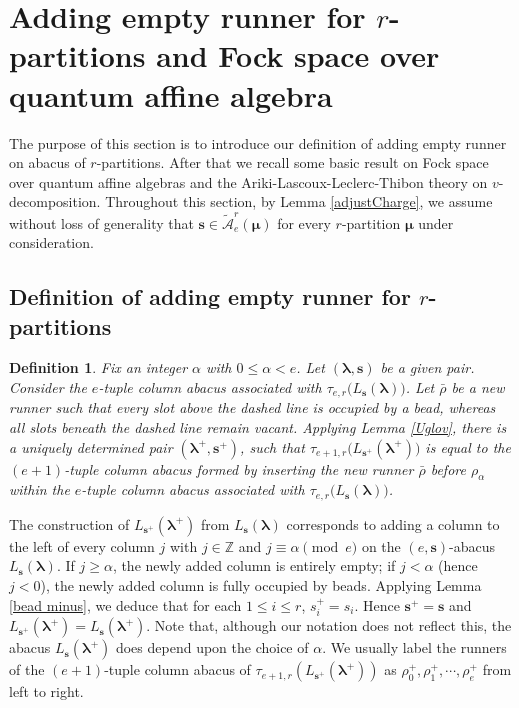 \documentclass[a4paper,10pt]{amsart}
\theoremstyle{plain}
\def\bs{{\boldsymbol{s}}}
\def\blam{{\boldsymbol \lambda}}
\theoremstyle{plain}
\newtheorem{dfn}[theorem]{Definition}
\numberwithin{equation}{section}
\begin{document}
\bigskip
\section{Adding empty runner for $r$-partitions and Fock space over quantum affine algebra}

The purpose of this section is to introduce our definition of adding empty runner on abacus of $r$-partitions. After that we recall some basic result on Fock space over quantum affine algebras and the Ariki-Lascoux-Leclerc-Thibon theory on $v$-decomposition. Throughout this section, by Lemma \ref{adjustCharge}, we assume without loss of generality that \(\boldsymbol{s} \in \widetilde{\mathcal A}^r_e(\boldsymbol{\mu})\) for every $r$-partition \(\boldsymbol{\mu}\) under consideration.

\smallskip
\subsection{Definition of adding empty runner for $r$-partitions}
\begin{dfn}\label{lamPlus} Fix an integer $\alpha$ with $0\le \alpha<e$. Let $(\blam,\bs)$ be a given pair. Consider the $e$-tuple column abacus associated with \(\tau_{e, r}\big(L_{\boldsymbol{s}}(\boldsymbol{\lambda})\big)\). Let  \(\bar{\rho}\) be a new runner such that every slot above the dashed line is occupied by a bead, whereas all slots beneath the dashed line remain vacant. Applying Lemma \ref{Uglov}, there is a uniquely determined pair $(\blam^+,\bs^+)$, such that \(\tau_{e+1, r}\big(L_{\boldsymbol{s}^+}(\boldsymbol{\lambda}^+)\big)\) is equal to the $(e+1)$-tuple column abacus formed by inserting the new runner \(\bar{\rho}\) before \(\rho_\alpha\) within the $e$-tuple column abacus associated with \(\tau_{e, r}\big(L_{\boldsymbol{s}}(\boldsymbol{\lambda})\big)\).
\end{dfn}

The construction of $L_{\bs^+}(\boldsymbol{\lambda}^+)$ from $L_{\bs}(\blam)$ corresponds to adding a column to the left of every column $j$ with \(j\in\mathbb Z\) and \(j\equiv \alpha\pmod e\) on the $(e,\bs)$-abacus \(L_{\boldsymbol{s}}(\boldsymbol{\lambda})\). If \(j\ge \alpha\), the newly added column is entirely empty; if \(j<\alpha\) (hence $j<0$), the newly added column is fully occupied by beads. Applying Lemma \ref{bead minus}, we deduce that for each $1\leq i\leq r$, $s_i^+=s_i$. Hence $\bs^+=\bs$ and $L_{\bs^+}(\blam^+)=L_{\bs}(\blam^+)$. Note that, although our notation does not reflect this, the abacus $L_{\bs}(\blam^+)$ does depend upon the choice of $\alpha$. We usually label the runners of the $(e+1)$-tuple column abacus of $\tau_{e+1,r}({L}_{\bs^+}(\blam^+))$ as $\rho^+_0,\rho^+_1,\cdots,\rho^+_{e}$ from left to right.
\end{document}
